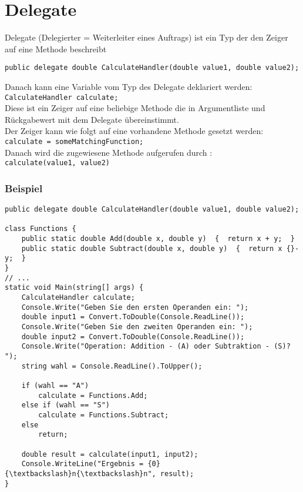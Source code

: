 \section{Delegate}
Delegate (Delegierter = Weiterleiter eines Auftrags) ist ein Typ der den Zeiger auf eine Methode beschreibt
\begin{lstlisting}[language={[Sharp]C}]
	public delegate double CalculateHandler(double value1, double value2); 
\end{lstlisting}
Danach kann eine Variable vom Typ des Delegate deklariert werden:\\
\lstinline$CalculateHandler calculate;$\\
Diese ist ein Zeiger auf eine beliebige Methode die in Argumentliste und Rückgabewert mit dem Delegate übereinstimmt.\\
Der Zeiger kann wie folgt auf eine vorhandene Methode gesetzt werden:\\
\lstinline$calculate = someMatchingFunction;$\\
Danach wird die zugewiesene Methode aufgerufen durch :\\
\lstinline$calculate(value1, value2)$

\subsubsection*{Beispiel}

\begin{lstlisting}[language={[Sharp]C}]
public delegate double CalculateHandler(double value1, double value2);

class Functions {
	public static double Add(double x, double y)  {  return x + y;  }
	public static double Subtract(double x, double y)  {  return x {}- y;  }
}
// ...
static void Main(string[] args) {
	CalculateHandler calculate;
	Console.Write("Geben Sie den ersten Operanden ein: ");
	double input1 = Convert.ToDouble(Console.ReadLine());
	Console.Write("Geben Sie den zweiten Operanden ein: ");
	double input2 = Convert.ToDouble(Console.ReadLine());  
	Console.Write("Operation: Addition - (A) oder Subtraktion - (S)? ");
	string wahl = Console.ReadLine().ToUpper();

	if (wahl == "A")
		calculate = Functions.Add;
	else if (wahl == "S") 
		calculate = Functions.Subtract;
	else 
		return;

	double result = calculate(input1, input2);
	Console.WriteLine("Ergebnis = {0}{\textbackslash}n{\textbackslash}n", result);
}
\end{lstlisting}

